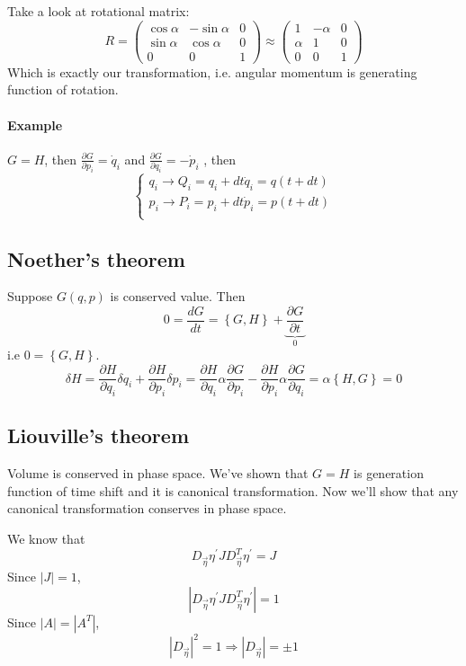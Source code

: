 Take a look at rotational matrix:
$$R = \begin{pmatrix}
\cos \alpha & -\sin \alpha&0\\
\sin \alpha & \cos \alpha&0\\
0&0&1
\end{pmatrix} \approx \begin{pmatrix}
1 & - \alpha&0\\
 \alpha &1&0\\
0&0&1
\end{pmatrix}$$
Which is exactly our transformation, i.e. angular momentum is generating function of rotation.
\paragraph{Example}
$G=H$, then $\frac{\partial G}{\partial p_i} = \dot{q}_i$ and $\frac{\partial G}{\partial q_i} = -\dot{p}_i$ , then
$$\begin{cases}
q_i \to Q_i = q_i + dt \dot{q}_i = q(t+dt)\\
p_i \to P_i = p_i + dt \dot{p}_i = p(t+dt)\\
\end{cases}$$

\subsection{Noether's theorem}
Suppose $G(q,p)$ is conserved value. Then 
$$0 = \frac{dG}{dt} = \left\{ G,H \right\} + \underbrace{\frac{\partial G}{\partial t}}_{0}$$
i.e $0 = \left\{ G,H \right\}$.
$$\delta H  = \frac{\partial H}{\partial q_i} \delta q_i+\frac{\partial H}{\partial p_i} \delta p_i = \frac{\partial H}{\partial q_i} \alpha\frac{\partial G}{\partial p_i}  -\frac{\partial H}{\partial p_i} \alpha\frac{\partial G}{\partial q_i} = \alpha \left\{ H,G \right\} = 0 $$
\subsection{Liouville's theorem}
Volume is conserved in phase space. We've shown that $G=H$ is generation function of time shift and it is canonical transformation. Now we'll show that any canonical transformation conserves in phase space.

We know that
$$D_{\vec{\eta}} \eta^\prime J D_{\vec{\eta}}^T \eta^\prime = J$$
Since $|J|=1$,
$$\left|D_{\vec{\eta}} \eta^\prime J D_{\vec{\eta}}^T \eta^\prime\right| = 1$$
Since $|A|=\left|A^T\right|$, 
$$\left|D_{\vec{\eta}}\right|^2 = 1 \Rightarrow \left|D_{\vec{\eta}}\right| = \pm1  $$


